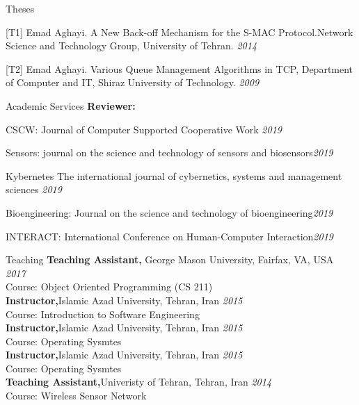 \documentclass{resume} %
\begin{document}
\begin{rSection}{Theses} 
\item [{[T1]}]Emad Aghayi. A New Back-off Mechanism for the S-MAC
Protocol.Network Science and Technology Group, University of Tehran. \hfill {\em  2014}
\item [{[T2]}]Emad Aghayi. Various Queue Management Algorithms in TCP,  Department of Computer and IT, Shiraz University of Technology. \hfill {\em  2009}
\end{rSection}

\begin{rSection}{Academic Services}
{\bf Reviewer:} 
\item CSCW: Journal of Computer Supported Cooperative Work \hfill {\em  2019} 
\item Sensors: journal on the science and technology of sensors and biosensors\hfill {\em  2019}
 \item Kybernetes The international journal of cybernetics, systems and management sciences \hfill {\em  2019}
\item Bioengineering: Journal on the science and technology of bioengineering\hfill {\em  2019}
 \item INTERACT: International Conference on Human-Computer Interaction\hfill {\em  2019}
 
\end{rSection}

\begin{rSection}{Teaching}
{\bf Teaching Assistant,}{ George Mason University, Fairfax, VA, USA} \hfill {\em  2017} 
\\ Course: Object Oriented Programming (CS 211)\\

{\bf Instructor,}{Islamic Azad University, Tehran, Iran} \hfill {\em 2015} 
\\ Course: Introduction to Software Engineering\\

{\bf Instructor,}{Islamic Azad University, Tehran, Iran} \hfill {\em 2015} 
\\ Course: Operating Sysmtes\\

{\bf Instructor,}{Islamic Azad University, Tehran, Iran} \hfill {\em 2015} 
\\ Course: Operating Sysmtes\\

{\bf Teaching Assistant,}{Univeristy of Tehran, Tehran, Iran} \hfill {\em 2014} 
\\ Course: Wireless Sensor Network\\

\end{rSection}
\end{document}
